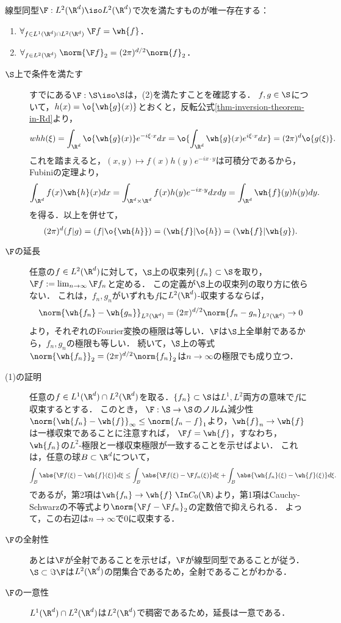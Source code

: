 \documentclass[uplatex,dvipdfmx]{jsreport}
\begin{document}
\begin{theorem}
    線型同型$\F:L^2(\R^d)\iso L^2(\R^d)$で次を満たすものが唯一存在する：
    \begin{enumerate}
        \item $\forall_{f\in L^1(\R^d)\cap L^2(\R^d)}\;\F f=\wh{f}$．
        \item $\forall_{f\in L^2(\R^d)}\;\norm{\F f}_2=(2\pi)^{d/2}\norm{f}_2$．
    \end{enumerate}
\end{theorem}
\begin{Proof}\mbox{}
    \begin{description}
        \item[$\S$上で条件を満たす] すでにある$\F:\S\iso\S$は，(2)を満たすことを確認する．
        $f,g\in\S$について，$h(x)=\o{\wh{g}(x)}$とおくと，反転公式\ref{thm-inversion-theorem-in-Rd}より，
        \[wh{h}(\xi)=\int_{\R^d}\o{\wh{g}(x)}e^{-i\xi\cdot x}dx=\o{\int_{\R^d}\wh{g}(x)e^{i\xi\cdot x}dx}=(2\pi)^d\o{g(\xi)}.\]
        これを踏まえると，$(x,y)\mapsto f(x)h(y)e^{-ix\cdot y}$は可積分であるから，Fubiniの定理より，
        \[\int_{\R^d}f(x)\wh{h}(x)dx=\int_{\R^d\times\R^d}f(x)h(y)e^{-ix\cdot y}dxdy=\int_{\R^d}\wh{f}(y)h(y)dy.\]
        を得る．以上を併せて，
        \[(2\pi)^d(f|g)=(f|\o{\wh{h}})=(\wh{f}|\o{h})=(\wh{f}|\wh{g}).\]
        \item[$\F$の延長] 任意の$f\in L^2(\R^d)$に対して，$\S$上の収束列$\{f_n\}\subset\S$を取り，$\F f:=\lim_{n\to\infty}\F f_n$と定める．
        この定義が$\S$上の収束列の取り方に依らない．
        これは，$f_n,g_n$がいずれも$f$に$L^2(\R^d)$-収束するならば，
        \[\norm{\wh{f_n}-\wh{g_n}}_{L^2(\R^d)}=(2\pi)^{d/2}\norm{f_n-g_n}_{L^2(\R^d)}\to0\]
        より，それぞれのFourier変換の極限は等しい．$\F$は$\S$上全単射であるから，$f_n,g_n$の極限も等しい．
        続いて，$\S$上の等式$\norm{\wh{f_n}}_2=(2\pi)^{d/2}\norm{f_n}_2$は$n\to\infty$の極限でも成り立つ．
        \item[(1)の証明] 任意の$f\in L^1(\R^d)\cap L^2(\R^d)$を取る．$\{f_n\}\subset\S$は$L^1,L^2$両方の意味で$f$に収束するとする．
        このとき，
        $\F:\S\to\S$のノルム減少性$\norm{\wh{f_n}-\wh{f}}_\infty\le\norm{f_n-f}_1$より，$\wh{f}_n\to\wh{f}$は一様収束であることに注意すれば，
        $\F f=\wh{f}$，すなわち，$\wh{f_n}$の$L^2$-極限と一様収束極限が一致することを示せばよい．
        これは，任意の球$B\subset\R^d$について，
        \[\int_B\abs{\F f(\xi)-\wh{f}(\xi)}d\xi\le\int_B\abs{\F f(\xi)-\F f_n(\xi)}d\xi+\int_B\abs{\wh{f_n}(\xi)-\wh{f}(\xi)}d\xi.\]
        であるが，第2項は$\wh{f_n}\to\wh{f}\;\In C_0(\R)$より，第1項はCauchy-Schwarzの不等式より$\norm{\F f-\F f_n}_2$の定数倍で抑えられる．
        よって，この右辺は$n\to\infty$で$0$に収束する．
        \item[$\F$の全射性] あとは$\F$が全射であることを示せば，$\F$が線型同型であることが従う．
        $\S\subset\Im\F$は$L^2(\R^d)$の閉集合であるため，全射であることがわかる．
        \item[$\F$の一意性] $L^1(\R^d)\cap L^2(\R^d)$は$L^2(\R^d)$で稠密であるため，延長は一意である．
    \end{description}
\end{Proof}
\end{document}
